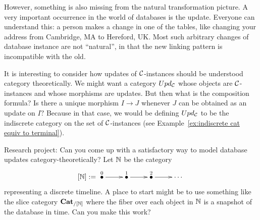 \documentclass[CT4S-EN-RU]{subfiles}
\begin{document}
\begin{blockRUS}
\end{blockRUS}

\begin{blockENG}
However, something is also missing from the natural transformation picture. A very important occurrence in the world of databases is the update. Everyone can understand this: a person makes a change in one of the tables, like changing your address from Cambridge, MA to Hereford, UK. Most such arbitrary changes of database instance are not “natural”, in that the new linking pattern is incompatible with the old.
\end{blockENG}

\begin{blockRUS}
\end{blockRUS}

\begin{blockENG}
It is interesting to consider how updates of $\mathcal{C}$-instances should be understood category theoretically. We might want a category $Upd_\mathcal{C}$ whose objects are $\mathcal{C}$-instances and whose morphisms are updates. But then what is the composition formula? Is there a unique morphism $I\to J$ whenever $J$ can be obtained as an update on $I?$ Because in that case, we would be defining $Upd_\mathcal{C}$ to be the indiscrete category on the set of $\mathcal{C}$-instances (see Example~\ref{ex:indiscrete cat equiv to terminal}).
\end{blockENG}

\begin{blockRUS}
\end{blockRUS}

\begin{exerciseENG}
Research project: Can you come up with a satisfactory way to model database updates category-theoretically? Let ${\mathbb N}$ be the category
$$[\NN]:=\xymatrix{\LMO{0}\ar[r]&\LMO{1}\ar[r]&\LMO{2}\ar[r]&\cdots}$$ 
representing a discrete timeline. A place to start might be to use something like the slice category ${\mathbf{Cat}}_{/[{\mathbb N}]}$ where the fiber over each object in ${\mathbb N}$ is a snapshot of the database in time. Can you make this work?
\end{exerciseENG}

\begin{exerciseRUS}
\end{exerciseRUS}


\subsection{}\label{sec:equivalence of cats}
\end{document}
